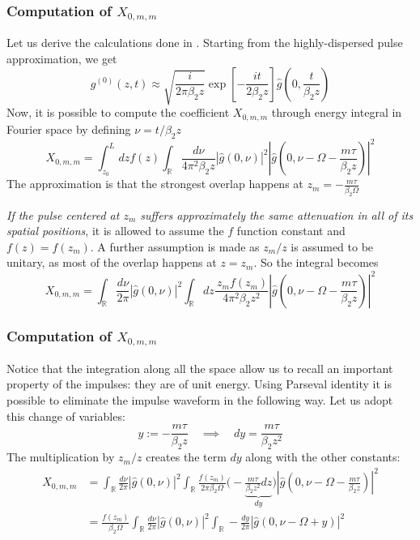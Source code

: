 \documentclass[8pt]{beamer} %
\begin{document}
\begin{frame}
	\frametitle{Computation of $X_{0, m, m}$}
	Let us derive the calculations done in \cite[eq. 11, 12]{Dar_2013}. Starting from the highly-dispersed pulse approximation, we get
	\begin{equation}
		g^{(0)}(z, t) \approx \sqrt{\frac{i}{2\pi \beta_2 z}} \exp\left[-\frac{it}{2 \beta_2 z}\right] \hat{g}\left(0, \frac{t}{\beta_2 z}\right)	
	\end{equation}
	Now, it is possible to compute the coefficient $X_{0, m, m}$ through energy integral in Fourier space by defining $\nu = t/\beta_2 z$
	\begin{equation}
		X_{0, m, m} = \int_{z_0}^{L} dz f(z) \int_{\mathbb{R}} \frac{d\nu}{4\pi^2 \beta_2 z} |\hat{g}(0, \nu)|^2 \left|\hat{g}\left(0, \nu-\Omega-\frac{m\tau}{\beta_2 z}\right)\right|^2
	\end{equation}
	The approximation is that the strongest overlap happens at $z_m = -\frac{m\tau}{\beta_2 \Omega}$
	
	\textit{If the pulse centered at $z_m$ suffers approximately the same attenuation in all of its spatial positions}, it is allowed to assume the $f$ function constant and $f(z) = f(z_m)$. A further assumption is made as $z_m/z$ is assumed to be unitary, as most of the overlap happens at $z=z_m$. So the integral becomes
	\begin{equation}
		X_{0, m, m} = \int_{\mathbb{R}} \frac{d\nu}{2\pi}  |\hat{g}(0, \nu)|^2 \int_{\mathbb{R}} dz\frac{\, z_m f(z_m)}{4\pi^2 \beta_2 z^2}\left|\hat{g}\left(0, \nu-\Omega-\frac{m\tau}{\beta_2 z}\right)\right|^2
	\end{equation}
\end{frame}


\begin{frame}
	\frametitle{Computation of $X_{0, m, m}$}
	Notice that the integration along all the space allow us to recall an important property of the impulses: they are of unit energy. Using Parseval identity it is possible to eliminate the impulse waveform in the following way.
	Let us adopt this change of variables:
	\begin{equation}
		y:= -\frac{m\tau}{\beta_2 z} \quad \implies \quad dy = \frac{m\tau}{\beta_2 z^2}
	\end{equation}
	The multiplication by $z_m/z$ creates the term $dy$ along with the other constants:
	\begin{align}
		X_{0, m, m} &= \int_{\mathbb{R}} \frac{d\nu}{2\pi}  |\hat{g}(0, \nu)|^2 \int_{\mathbb{R}} \frac{f(z_m)}{2\pi \beta_2 \Omega}  \Big(-\underbrace{\frac{m\tau}{\beta_2 z^2} dz}_{dy}\Big) \left|\hat{g}\left(0, \nu-\Omega-\frac{m\tau}{\beta_2 z}\right)\right|^2 \\
		&=  \frac{f(z_m)}{ \beta_2 \Omega}\int_{\mathbb{R}} \frac{d\nu}{2\pi}  |\hat{g}(0, \nu)|^2 \int_{\mathbb{R}} - \frac{dy}{2\pi} \left|\hat{g}\left(0, \nu-\Omega + y \right)\right|^2
	\end{align}
\end{frame}
\end{document}
